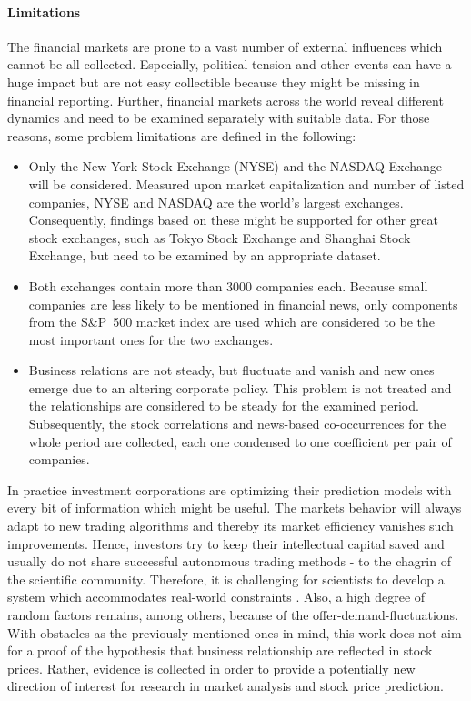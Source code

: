 
\paragraph{Limitations}
The financial markets are prone to a vast number of external influences which cannot be all collected. Especially, political tension and other events can have a huge impact but are not easy collectible because they might be missing in financial reporting. Further, financial markets across the world reveal different dynamics \cite{Hsu2016BridgingEconomists} and need to be examined separately with suitable data. For those reasons, some problem limitations are defined in the following: 

\begin{itemize}
    \item Only the New York Stock Exchange (NYSE) and the NASDAQ Exchange will be considered. Measured upon market capitalization and number of listed companies, NYSE and NASDAQ are the world's largest exchanges. Consequently, findings based on these might be supported for other great stock exchanges, such as Tokyo Stock Exchange and Shanghai Stock Exchange, but need to be examined by an appropriate dataset.
    \item Both exchanges contain more than 3000 companies each. Because small companies are less likely to be mentioned in financial news, only components from the S\&P~500 market index are used which are considered to be the most important ones for the two exchanges.
    \item Business relations are not steady, but fluctuate and vanish and new ones emerge due to an altering corporate policy. This problem is not treated and the relationships are considered to be steady for the examined period. Subsequently, the stock correlations and news-based co-occurrences for the whole period are collected, each one condensed to one coefficient per pair of companies.
\end{itemize}

In practice investment corporations are optimizing their prediction models with every bit of information which might be useful. The markets behavior will always adapt to new trading algorithms and thereby its market efficiency vanishes such improvements. Hence, investors try to keep their intellectual capital saved and usually do not share successful autonomous trading methods - to the chagrin of the scientific community. Therefore, it is challenging for scientists to develop a system which accommodates real-world constraints \cite{Vanstone2009AnNetworks}. Also, a high degree of random factors remains, among others, because of the offer-demand-fluctuations. With obstacles as the previously mentioned ones in mind, this work does not aim for a proof of the hypothesis that business relationship are reflected in stock prices. Rather, evidence is collected in order to provide a potentially new direction of interest for research in market analysis and stock price prediction.

